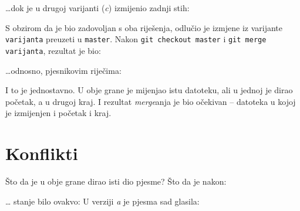 \dots{}dok je u drugoj varijanti (\emph c) izmijenio zadnji stih:


S obzirom da je bio zadovoljan s oba riješenja, odlučio je izmjene iz varijante \verb+varijanta+ preuzeti u \verb+master+.
Nakon \verb+git checkout master+ i \verb+git merge varijanta+, rezultat je bio:



\dots{}odnosno, pjesnikovim riječima:


I to je jednostavno.
U obje grane je mijenjao istu datoteku, ali u jednoj je dirao početak, a u drugoj kraj.
I rezultat \emph{merge}anja je bio očekivan -- datoteka u kojoj je izmijenjen i početak i kraj.

\section*{Konflikti}

Što da je u obje grane dirao isti dio pjesme?
Što da je nakon:



\dots{} stanje bilo ovakvo:
U verziji \emph a je pjesma sad glasila:

